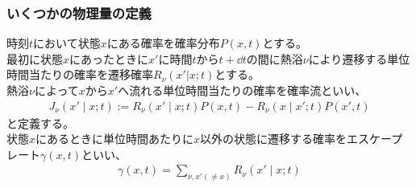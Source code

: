 \documentclass{ltjsarticle}
\begin{document}
\subsubsection{いくつかの物理量の定義}
時刻$t$において状態$x$にある確率を確率分布$P(x,t)$とする。\\
最初に状態$x$にあったときに$x'$に時間$t$から$t+\dd{t}$の間に熱浴$\nu$により遷移する単位時間当たりの確率を遷移確率$R_\nu(x'|x;t)$とする。\\
熱浴$\nu$によって$x$から$x'$へ流れる単位時間当たりの確率を確率流といい、
\begin{align}
  J_\nu(x'\mid x;t):=R_\nu(x'\mid x;t)P(x,t)-R_\nu(x\mid x';t)P(x',t)
\end{align}
と定義する。\\
状態$x$にあるときに単位時間あたりに$x$以外の状態に遷移する確率をエスケープレート$\gamma(x,t)$といい、
\begin{align}
  \gamma(x,t)=\sum_{\nu,x'(\neq x)}R_\nu(x'\mid x;t)
\end{align}\\
\end{document}
